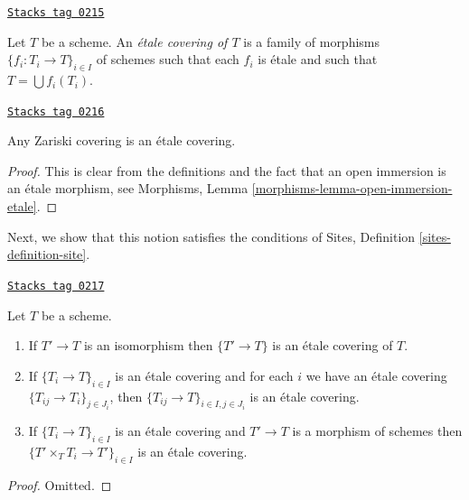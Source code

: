 \begin{definition}
\label{topologies-definition-etale-covering}
\href{https://stacks.math.columbia.edu/tag/0215}{\texttt{Stacks tag 0215}}

Let $T$ be a scheme. An {\it \'etale covering of $T$} is a family
of morphisms $\{f_i : T_i \to T\}_{i \in I}$ of schemes
such that each $f_i$ is \'etale and such that $T = \bigcup f_i(T_i)$.
\end{definition}

\begin{lemma}
\label{topologies-lemma-zariski-etale}
\href{https://stacks.math.columbia.edu/tag/0216}{\texttt{Stacks tag 0216}}

Any Zariski covering is an \'etale covering.
\end{lemma}

\begin{proof}
This is clear from the definitions and the fact that an open immersion
is an \'etale morphism, see
Morphisms, Lemma \ref{morphisms-lemma-open-immersion-etale}.
\end{proof}

Next, we show that this notion satisfies the conditions of
Sites, Definition \ref{sites-definition-site}.

\begin{lemma}[Etale]
\label{topologies-lemma-etale}
\href{https://stacks.math.columbia.edu/tag/0217}{\texttt{Stacks tag 0217}}

Let $T$ be a scheme.
\begin{enumerate}
\item If $T' \to T$ is an isomorphism then $\{T' \to T\}$
is an \'etale covering of $T$.
\item If $\{T_i \to T\}_{i\in I}$ is an \'etale covering and for each
$i$ we have an \'etale covering $\{T_{ij} \to T_i\}_{j\in J_i}$, then
$\{T_{ij} \to T\}_{i \in I, j\in J_i}$ is an \'etale covering.
\item If $\{T_i \to T\}_{i\in I}$ is an \'etale covering
and $T' \to T$ is a morphism of schemes then
$\{T' \times_T T_i \to T'\}_{i\in I}$ is an \'etale covering.
\end{enumerate}
\end{lemma}

\begin{proof}
Omitted.
\end{proof}

